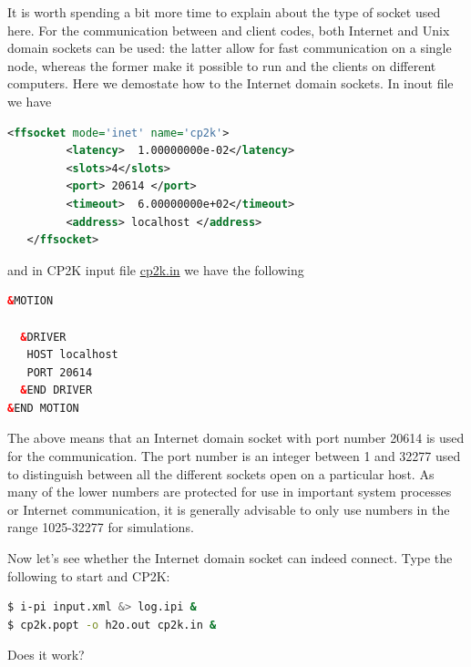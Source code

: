 \documentclass{article}
\begin{document}
\begin{Exercise}[label={basic},title={Keywords, outputs, and units of \ipi{}}]
\Question
It is worth spending a bit more time to explain about the type of socket used here.
For the communication between \ipi{} and client codes, both Internet and Unix domain sockets can be used: the
latter allow for fast communication on a single node, whereas the former make it possible
to run \ipi{} and the clients on different computers.
Here we demostate how to the Internet domain sockets.
In \ipi{} inout file we have
\begin{lstlisting}[language=xml]
    <ffsocket mode='inet' name='cp2k'>
         <latency>  1.00000000e-02</latency>
         <slots>4</slots>
         <port> 20614 </port>
         <timeout>  6.00000000e+02</timeout>
         <address> localhost </address>
   </ffsocket> 
\end{lstlisting}
and in CP2K input file \url{cp2k.in} we have the following
\begin{lstlisting}[language=xml]
&MOTION

  &DRIVER
   HOST localhost
   PORT 20614
  &END DRIVER
&END MOTION
\end{lstlisting}
The above means that an Internet domain socket with port number 20614 is used for the communication.
The port number is an integer between 1 and 32277 used to distinguish between all the
different sockets open on a particular host. As many of the lower numbers are protected
for use in important system processes or Internet communication, it is generally advisable
to only use numbers in the range 1025-32277 for simulations.

\Question
Now let's see whether the Internet domain socket can indeed connect.
Type the following to start \ipi{} and CP2K:
\begin{lstlisting}[language=bash]
$ i-pi input.xml &> log.ipi &
$ cp2k.popt -o h2o.out cp2k.in &
\end{lstlisting}
Does it work?

\end{Exercise}
\end{document}
